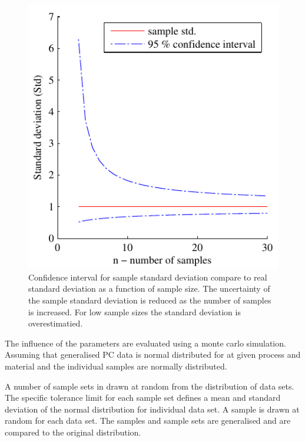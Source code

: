 \documentclass[aip,amsmath, reprint, author-year]{revtex4-1}
\begin{document}
\begin{figure}
\includegraphics{stats_std_confidence.pdf}
\caption{\label{fig:std_uncertainty}Confidence interval for sample standard deviation compare to real standard deviation as a function of sample size. The uncertainty of the sample standard deviation is reduced as the number of samples is increased. For low sample sizes the standard deviation is overestimatied.}
\end{figure}

The influence of the parameters are evaluated using a monte carlo simulation. Assuming that generalised PC data is normal distributed for at given process and material and the individual samples are normally distributed.

A number of sample sets in drawn at random from the distribution of data sets. The specific tolerance limit for each sample set defines a mean and standard deviation of the normal distribution for individual data set. A sample is drawn at random for each data set. The samples and sample sets are generalised and are compared to the original distribution.
\end{document}
